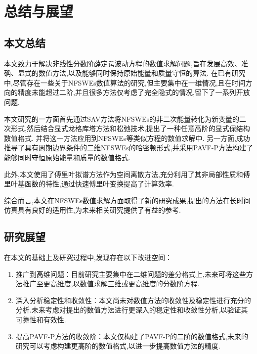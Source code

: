 
\chapter[总结与展望]{总结与展望}
\section{本文总结}

本文致力于解决非线性分数阶薛定谔波动方程的数值求解问题,旨在发展高效、准确、显式的数值方法,以及能够同时保持原始能量和质量守恒的算法.
在已有研究中,尽管存在一些关于NFSWEs数值算法的研究,但主要集中在一维情况,且在时间方向的精度未能超过二阶,并且很多方法仅考虑了完全隐式的情况,留下了一系列开放问题.

本文研究的一方面首先通过SAV方法将NFSWEs的非二次能量转化为新变量的二次形式,然后结合显式龙格库塔方法和松弛技术,提出了一种任意高阶的显式保结构数值格式.
并将这一方法应用到NFSWEs等类似方程的数值求解中.
另一方面,成功推导了具有周期边界条件的二维NFSWEs的哈密顿形式,并采用PAVF-P方法构建了能够同时守恒原始能量和质量的数值格式.

此外,本文使用了傅里叶拟谱方法作为空间离散方法,充分利用了其非局部性质和傅里叶基函数的特性,通过快速傅里叶变换提高了计算效率.

综合而言,本文在NFSWEs数值求解方面取得了新的研究成果,提出的方法在长时间仿真具有良好的适用性,为未来相关研究提供了有益的参考.

\section{研究展望}
在本文的基础上及研究过程中,发现存在以下改进空间：

\begin{enumerate}[(1)]
    \item 推广到高维问题：目前研究主要集中在二维问题的差分格式上,未来可将这些方法推广至更高维度,以数值求解三维或更高维度的分数阶方程.
    
    \item 深入分析稳定性和收敛性：本文尚未对数值方法的收敛性及稳定性进行充分的分析.未来考虑对提出的数值方法进行更深入的稳定性和收敛性分析,以验证其可靠性和有效性.
    
    \item 提高PAVF-P方法的收敛阶：本文仅构建了PAVF-P的二阶的数值格式,未来的研究可以考虑构建更高阶的数值格式,以进一步提高数值方法的精度.
\end{enumerate}

